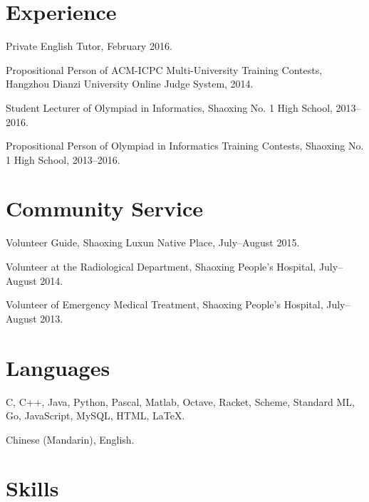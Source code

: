\documentclass[letterpaper]{article}
\renewenvironment{itemize}{
  \begin{list}{}{
    \setlength{\leftmargin}{1.5em}
  }
}{
  \end{list}
}
\begin{document}
\section*{Experience}

\begin{itemize}
  \item Private English Tutor, February 2016.

  \item Propositional Person of ACM-ICPC Multi-University Training Contests, Hangzhou Dianzi University Online Judge System, 2014.

  \item Student Lecturer of Olympiad in Informatics, Shaoxing No. 1 High School, 2013--2016.
 
  \item Propositional Person of Olympiad in Informatics Training Contests, Shaoxing No. 1 High School, 2013--2016.
\end{itemize}


\section*{Community Service}

\begin{itemize}
  \item Volunteer Guide, Shaoxing Luxun Native Place, July--August 2015.

  \item Volunteer at the Radiological Department, Shaoxing People's Hospital, July--August 2014.

  \item Volunteer of Emergency Medical Treatment, Shaoxing People's Hospital, July--August 2013.

\end{itemize}


\section*{Languages}

\begin{itemize}
  \item C, C++, Java, Python, Pascal, Matlab, Octave, Racket, Scheme, Standard ML, Go, JavaScript, MySQL, HTML, \LaTeX.
  \item Chinese (Mandarin), English.
\end{itemize}


\section*{Skills}
\end{document}

